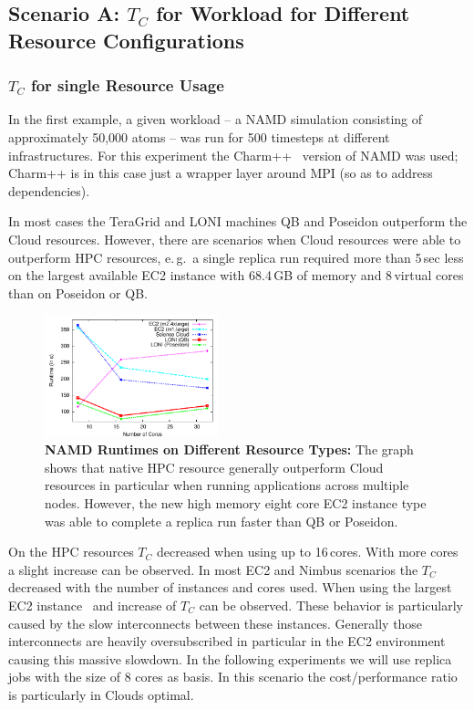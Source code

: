 \documentclass[conference,final]{IEEEtran}
\newcommand{\up}{\vspace*{-1em}}
\newcommand{\tc}{$T_{C}$ }
\begin{document}
\subsection{Scenario A: \tc for Workload for Different Resource
  Configurations}
\up

\subsubsection{\tc for single Resource Usage}

In the first example, a given workload -- a NAMD simulation consisting
of approximately 50,000 atoms -- was run for 500 timesteps at different
infrastructures. For this experiment the Charm++~\cite{871085} version
of NAMD was used; Charm++ is in this case just a wrapper layer around
MPI (so as to address dependencies).

In most cases the TeraGrid and LONI machines QB and Poseidon
outperform the Cloud resources.  However, there are scenarios when
Cloud resources were able to outperform HPC resources, e.\,g.\ a
single replica run required more than 5\,sec less on the largest
available EC2 instance with 68.4\,GB of memory and 8\,virtual cores
than on Poseidon or QB.

\begin{figure}[htbp]
    \centering
    \includegraphics[width=0.45\textwidth]{performance/namd_run.pdf}
    \caption{\textbf{NAMD Runtimes on Different Resource Types: } The
      graph shows that native HPC resource generally outperform Cloud
      resources in particular when running applications across
      multiple nodes. However, the new high memory eight core EC2
      instance type was able to complete a replica run faster than QB
      or Poseidon.}
    \label{fig:performance_namd_run}
\end{figure}

On the HPC resources \tc decreased when using up to 16\,cores. With
more cores a slight increase can be observed. In most EC2 and Nimbus
scenarios the \tc decreased with the number of instances and cores
used. When using the largest EC2 instance~\cite{new-ec2} and increase
of \tc can be observed. These behavior is particularly caused by the
slow interconnects between these instances. Generally those
interconnects are heavily oversubscribed in particular in the EC2
environment causing this massive slowdown. In the following
experiments we will use replica jobs with the size of 8 cores as
basis. In this scenario the cost/performance ratio is particularly in
Clouds optimal.
\end{document}
